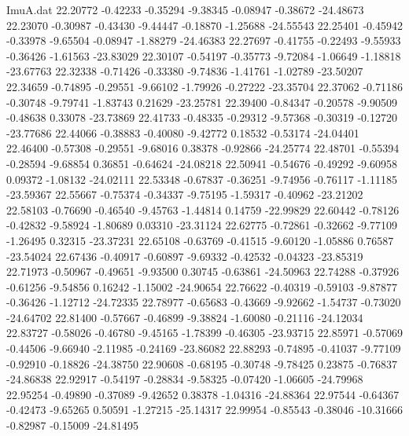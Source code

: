 \begin{filecontents}{ImuA.dat}
  22.20772   -0.42233   -0.35294   -9.38345   -0.08947   -0.38672  -24.48673
  22.23070   -0.30987   -0.43430   -9.44447   -0.18870   -1.25688  -24.55543
  22.25401   -0.45942   -0.33978   -9.65504   -0.08947   -1.88279  -24.46383
  22.27697   -0.41755   -0.22493   -9.55933   -0.36426   -1.61563  -23.83029
  22.30107   -0.54197   -0.35773   -9.72084   -1.06649   -1.18818  -23.67763
  22.32338   -0.71426   -0.33380   -9.74836   -1.41761   -1.02789  -23.50207
  22.34659   -0.74895   -0.29551   -9.66102   -1.79926   -0.27222  -23.35704
  22.37062   -0.71186   -0.30748   -9.79741   -1.83743    0.21629  -23.25781
  22.39400   -0.84347   -0.20578   -9.90509   -0.48638    0.33078  -23.73869
  22.41733   -0.48335   -0.29312   -9.57368   -0.30319   -0.12720  -23.77686
  22.44066   -0.38883   -0.40080   -9.42772    0.18532   -0.53174  -24.04401
  22.46400   -0.57308   -0.29551   -9.68016    0.38378   -0.92866  -24.25774
  22.48701   -0.55394   -0.28594   -9.68854    0.36851   -0.64624  -24.08218
  22.50941   -0.54676   -0.49292   -9.60958    0.09372   -1.08132  -24.02111
  22.53348   -0.67837   -0.36251   -9.74956   -0.76117   -1.11185  -23.59367
  22.55667   -0.75374   -0.34337   -9.75195   -1.59317   -0.40962  -23.21202
  22.58103   -0.76690   -0.46540   -9.45763   -1.44814    0.14759  -22.99829
  22.60442   -0.78126   -0.42832   -9.58924   -1.80689    0.03310  -23.31124
  22.62775   -0.72861   -0.32662   -9.77109   -1.26495    0.32315  -23.37231
  22.65108   -0.63769   -0.41515   -9.60120   -1.05886    0.76587  -23.54024
  22.67436   -0.40917   -0.60897   -9.69332   -0.42532   -0.04323  -23.85319
  22.71973   -0.50967   -0.49651   -9.93500    0.30745   -0.63861  -24.50963
  22.74288   -0.37926   -0.61256   -9.54856    0.16242   -1.15002  -24.90654
  22.76622   -0.40319   -0.59103   -9.87877   -0.36426   -1.12712  -24.72335
  22.78977   -0.65683   -0.43669   -9.92662   -1.54737   -0.73020  -24.64702
  22.81400   -0.57667   -0.46899   -9.38824   -1.60080   -0.21116  -24.12034
  22.83727   -0.58026   -0.46780   -9.45165   -1.78399   -0.46305  -23.93715
  22.85971   -0.57069   -0.44506   -9.66940   -2.11985   -0.24169  -23.86082
  22.88293   -0.74895   -0.41037   -9.77109   -0.92910   -0.18826  -24.38750
  22.90608   -0.68195   -0.30748   -9.78425    0.23875   -0.76837  -24.86838
  22.92917   -0.54197   -0.28834   -9.58325   -0.07420   -1.06605  -24.79968
  22.95254   -0.49890   -0.37089   -9.42652    0.38378   -1.04316  -24.88364
  22.97544   -0.64367   -0.42473   -9.65265    0.50591   -1.27215  -25.14317
  22.99954   -0.85543   -0.38046  -10.31666   -0.82987   -0.15009  -24.81495

\end{filecontents}
